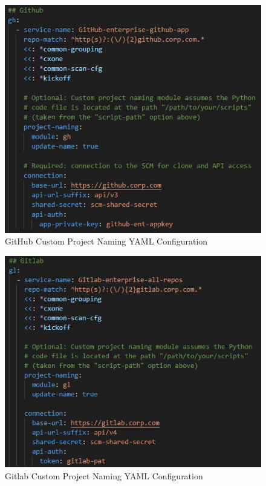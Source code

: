 \begin{figure}[h]
    \includegraphics[width=\textwidth]{graphics/naming_example_gh.png}
    \caption{GitHub Custom Project Naming YAML Configuration}
    \label{fig:naming-yaml-gh}
\end{figure}

\begin{figure}[h]
    \includegraphics[width=\textwidth]{graphics/naming_example_gl.png}
    \caption{Gitlab Custom Project Naming YAML Configuration}
    \label{fig:naming-yaml-gl}
\end{figure}

